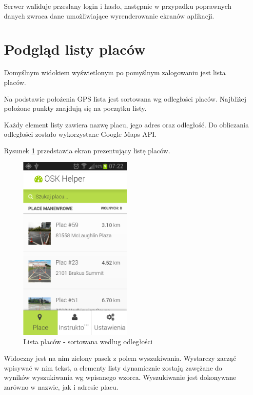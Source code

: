 \documentclass[twoside,a4paper,openright,12pt]{book}
\begin{document}
Serwer waliduje przesłany login i hasło, następnie w przypadku poprawnych danych zwraca dane umożliwiające wyrenderowanie ekranów aplikacji.


\section{Podgląd listy placów}
Domyślnym widokiem wyświetlonym po pomyślnym zalogowaniu jest lista placów.

Na podstawie położenia GPS lista jest sortowana wg odległości placów. Najbliżej położone punkty znajdują się na początku listy.

Każdy element listy zawiera nazwę placu, jego adres oraz odległość. Do obliczania odległości zostało wykorzystane Google Maps API.

Rysunek \ref{fig:Lista_placow_mobile} przedstawia ekran prezentujący listę placów.

\begin{figure}[H]
\centering
\includegraphics[width=0.5\textwidth]{screenshots/android/lista_placow.png}
\caption{Lista placów - sortowana według odległości}
\label{fig:Lista_placow_mobile}
\end{figure}

Widoczny jest na nim zielony pasek z polem wyszukiwania. Wystarczy zacząć wpisywać w nim tekst, a elementy listy dynamicznie zostają zawężane do wyników wyszukiwania wg wpisanego wzorca. Wyszukiwanie jest dokonywane zarówno w nazwie, jak i adresie placu.
\end{document}
